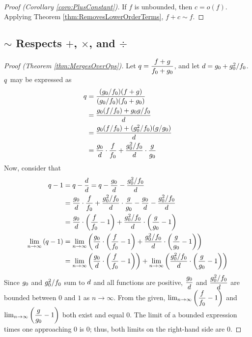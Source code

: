 \begin{proof}[Proof (Corollary \ref{coro:PlusConstant})]
	If $f$ is unbounded, then $c = o(f)$. Applying Theorem \ref{thm:RemovesLowerOrderTerms}, $f + c \sim f$.
\end{proof}

\subsection{$\sim$ Respects $+$, $\times$, and $\div$}

\begin{proof}[Proof (Theorem \ref{thm:MergesOverOps})]
	Let $q = \dfrac{f + g}{f_0 + g_0}$, and let $d = g_0 + g_0^2 / f_0$. $q$ may be expressed as
	\begin{align*}
	q &= \frac{(g_0 / f_0)(f + g)}{(g_0 / f_0)(f_0 + g_0)}\\
	&= \frac{g_0(f / f_0) + g_0g / f_0}{d}\\
	&= \frac{g_0(f / f_0) + (g_0^2 / f_0)(g / g_0)}{d}\\
	&= \frac{g_0}{d} \cdot \frac{f}{f_0} + \frac{g_0^2 / f_0}{d} \cdot \frac{g}{g_0}
	\end{align*}
	Now, consider that
	\begin{align*}
	q - 1 &= q - \frac{d}{d} = q - \frac{g_0}{d} - \frac{g_0^2 / f_0}{d}\\
	&= \frac{g_0}{d} \cdot \frac{f}{f_0} + \frac{g_0^2 / f_0}{d} \cdot \frac{g}{g_0} - \frac{g_0}{d} - \frac{g_0^2 / f_0}{d}\\
	&= \frac{g_0}{d} \cdot \left( \frac{f}{f_0} - 1 \right) + \frac{g_0^2 / f_0}{d} \cdot \left( \frac{g}{g_0} - 1 \right)\\
	\lim_{n \to \infty} \left( q - 1 \right) &= \lim_{n \to \infty} \left( \frac{g_0}{d} \cdot \left( \frac{f}{f_0} - 1 \right) + \frac{g_0^2 / f_0}{d} \cdot \left( \frac{g}{g_0} - 1 \right) \right)\\
	&= \lim_{n \to \infty} \left( \frac{g_0}{d} \cdot \left( \frac{f}{f_0} - 1 \right) \right) + \lim_{n \to \infty} \left( \frac{g_0^2 / f_0}{d} \cdot \left( \frac{g}{g_0} - 1 \right) \right)
	\end{align*}
	Since $g_0$ and $g_0^2 / f_0$ sum to $d$ and all functions are positive, $\dfrac{g_0}{d}$ and $\dfrac{g_0^2 / f_0}{d}$ are bounded between $0$ and $1$ as $n \to \infty$. From the given, $\lim_{n \to \infty} \left( \dfrac{f}{f_0} - 1 \right)$ and $\lim_{n \to \infty} \left( \dfrac{g}{g_0} - 1 \right)$ both exist and equal $0$. The limit of a bounded expression times one approaching $0$ is $0$; thus, both limits on the right-hand side are $0$.
	

\end{proof}
